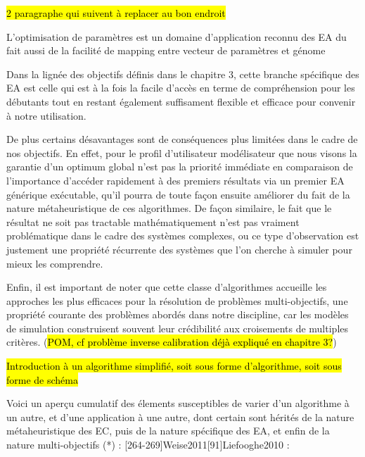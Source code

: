 \hl{2 paragraphe qui suivent à replacer au bon endroit}

L'optimisation de paramètres est un domaine d'application reconnu des EA du fait aussi de la facilité de mapping entre vecteur de paramètres et génome \autocite[83]{DeJong2006a}

Dans la lignée des objectifs définis dans le chapitre 3, cette branche spécifique des EA est celle qui est à la fois la facile d'accès en terme de compréhension pour les débutants tout en restant également suffisament flexible et efficace pour convenir à notre utilisation.

De plus certains désavantages sont de conséquences plus limitées dans le cadre de nos objectifs. En effet, pour le profil d'utilisateur modélisateur que nous visons la garantie d'un optimum global n'est pas la priorité immédiate en comparaison de l'importance d'accéder rapidement à des premiers résultats via un premier EA générique exécutable, qu'il pourra de toute façon ensuite améliorer du fait de la nature métaheuristique de ces algorithmes. De façon similaire, le fait que le résultat ne soit pas tractable mathématiquement n'est pas vraiment problématique dans le cadre des systèmes complexes, ou ce type d'observation est justement une propriété récurrente des systèmes que l'on cherche à simuler pour mieux les comprendre.

Enfin, il est important de noter que cette classe d'algorithmes accueille les approches les plus efficaces pour la résolution de problèmes multi-objectifs, une propriété courante des problèmes abordés dans notre discipline, car les modèles de simulation construisent souvent leur crédibilité aux croisements de multiples critères. (\hl{POM, cf problème inverse calibration déjà expliqué en chapitre 3?})

\hl{Introduction à un algorithme simplifié, soit sous forme d'algorithme, soit sous forme de schéma}


Voici un aperçu cumulatif des élements susceptibles de varier d'un algorithme à un autre, et d'une application à une autre, dont certain sont hérités de la nature métaheuristique des EC, puis de la nature spécifique des EA, et enfin de la nature multi-objectifs (*) : \autocite[69,72,115]{DeJong2006a}[264-269]{Weise2011}[91]{Liefooghe2010} :

